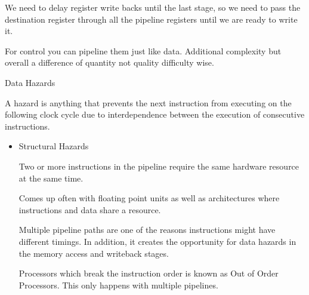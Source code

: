 \documentclass{report}
\begin{document}
\begin{description}
\begin{mdframed}
            We need to delay register write backs until the
            last stage, so we need to pass the destination
            register through all the pipeline registers
            until we are ready to write it.

            For control you can pipeline them just like data.
            Additional complexity but overall a difference of
            quantity not quality difficulty wise.
        \end{mdframed}
        \pagebreak
    \item Data Hazards
        \begin{mdframed}
            A hazard is anything that prevents the next
            instruction from executing on the following clock
            cycle due to interdependence between the execution
            of consecutive instructions.
            \begin{itemize}
                \item Structural Hazards

                    Two or more instructions in the pipeline
                    require the same hardware resource at the
                    same time.

                    Comes up often with floating point units
                    as well as architectures where instructions
                    and data share a resource.

                    Multiple pipeline paths are one of the reasons
                    instructions might have different timings.
                    In addition, it creates the opportunity for
                    data hazards in the memory access and writeback
                    stages.

                    Processors which break the instruction order
                    is known as Out of Order Processors.
                    This only happens with multiple pipelines.
            \end{itemize}
        \end{mdframed}
\end{description}
\end{document}
